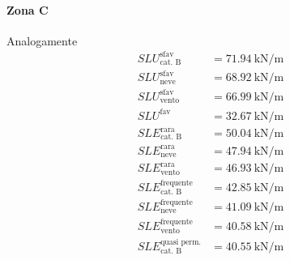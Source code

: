 \paragraph*{Zona C} Analogamente
\begin{align*} 
	SLU^{\text{sfav}}_{\text{cat. B}}		&= \SI{71.94}{\kilo\newton\per\meter} \\
	SLU^{\text{sfav}}_{\text{neve}} 		&= \SI{68.92}{\kilo\newton\per\meter} \\
	SLU^{\text{sfav}}_{\text{vento}} 		&= \SI{66.99}{\kilo\newton\per\meter} \\
	SLU^{\text{fav}} 						&= \SI{32.67}{\kilo\newton\per\meter} \\	
	SLE^{\text{rara}}_{\text{cat. B}} 		&= \SI{50.04}{\kilo\newton\per\meter} \\
	SLE^{\text{rara}}_{\text{neve}}			&= \SI{47.94}{\kilo\newton\per\meter} \\
	SLE^{\text{rara}}_{\text{vento}} 		&= \SI{46.93}{\kilo\newton\per\meter} \\
	SLE^{\text{frequente}}_{\text{cat. B}} 	&= \SI{42.85}{\kilo\newton\per\meter} \\
	SLE^{\text{frequente}}_{\text{neve}} 	&= \SI{41.09}{\kilo\newton\per\meter} \\
	SLE^{\text{frequente}}_{\text{vento}} 	&= \SI{40.58}{\kilo\newton\per\meter} \\
	SLE^{\text{quasi perm.}}_{\text{cat. B}}&= \SI{40.55}{\kilo\newton\per\meter}
\end{align*}

